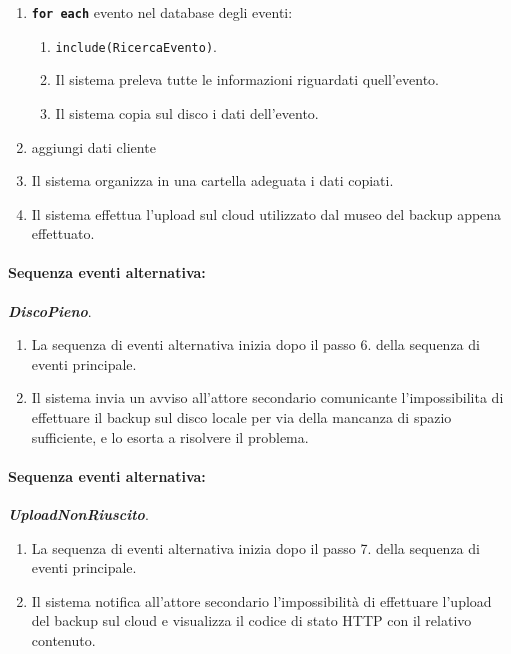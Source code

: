 \documentclass{article}
\begin{document}
\begin{enumerate}[itemsep=8pt,parsep=0pt]
  		\item \texttt{\textbf{for each}} evento nel database degli eventi:
	          \begin{enumerate}	[leftmargin=28pt]
			\item  \texttt{{include(RicercaEvento)}}.
	          	\item Il sistema preleva tutte le informazioni riguardati quell'evento.
			\item Il sistema copia sul disco i dati dell'evento.
	          \end{enumerate}

		\item aggiungi dati cliente

		\item Il sistema organizza in una cartella adeguata i dati copiati.
		\item Il sistema effettua l'upload sul cloud utilizzato dal museo del backup appena effettuato.
	\end{enumerate}
	
    	\paragraph{Sequenza eventi alternativa:} \textbf{\textit{DiscoPieno}}.
	\begin{enumerate}[itemsep=8pt,parsep=0pt]
	\item La sequenza di eventi alternativa inizia dopo il passo 6. della sequenza di eventi principale.
	\item Il sistema invia un avviso all'attore secondario comunicante l'impossibilita di effettuare il backup sul disco locale per via della mancanza di spazio sufficiente, e lo esorta a risolvere il problema.
	\end{enumerate}

    	\paragraph{Sequenza eventi alternativa:} \textbf{\textit{UploadNonRiuscito}}.
	\begin{enumerate}[itemsep=8pt,parsep=0pt]
	\item La sequenza di eventi alternativa inizia dopo il passo 7. della sequenza di eventi principale.
	\item Il sistema notifica all'attore secondario l'impossibilità di effettuare l'upload del backup sul cloud e visualizza il codice di stato HTTP con il relativo contenuto.
	\end{enumerate}
\end{document}

